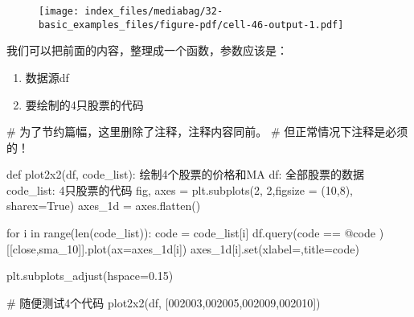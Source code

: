 \documentclass[
  letterpaper,
  DIV=11,
  numbers=noendperiod]{scrreprt}
\newenvironment{Shaded}{\begin{snugshade}}{\end{snugshade}}
\newcommand{\BuiltInTok}[1]{\textcolor[rgb]{0.00,0.23,0.31}{#1}}
\newcommand{\CommentTok}[1]{\textcolor[rgb]{0.37,0.37,0.37}{#1}}
\newcommand{\ControlFlowTok}[1]{\textcolor[rgb]{0.00,0.23,0.31}{#1}}
\newcommand{\DecValTok}[1]{\textcolor[rgb]{0.68,0.00,0.00}{#1}}
\newcommand{\FloatTok}[1]{\textcolor[rgb]{0.68,0.00,0.00}{#1}}
\newcommand{\KeywordTok}[1]{\textcolor[rgb]{0.00,0.23,0.31}{#1}}
\newcommand{\NormalTok}[1]{\textcolor[rgb]{0.00,0.23,0.31}{#1}}
\newcommand{\OperatorTok}[1]{\textcolor[rgb]{0.37,0.37,0.37}{#1}}
\newcommand{\StringTok}[1]{\textcolor[rgb]{0.13,0.47,0.30}{#1}}
\newcommand{\VariableTok}[1]{\textcolor[rgb]{0.07,0.07,0.07}{#1}}
\providecommand{\tightlist}{%
  \setlength{\itemsep}{0pt}\setlength{\parskip}{0pt}}\usepackage{longtable,booktabs,array}
\begin{document}
\begin{figure}[H]

{\centering \texttt{[image: index\_files/mediabag/32-basic\_examples\_files/figure-pdf/cell-46-output-1.pdf]}

}

\end{figure}

我们可以把前面的内容，整理成一个函数，参数应该是：

\begin{enumerate}
\def\labelenumi{\arabic{enumi}.}
\tightlist
\item
  数据源df
\item
  要绘制的4只股票的代码
\end{enumerate}

\begin{Shaded}
\begin{Highlighting}[]
\CommentTok{\# 为了节约篇幅，这里删除了注释，注释内容同前。}
\CommentTok{\# 但正常情况下注释是必须的！}

\KeywordTok{def}\NormalTok{ plot2x2(df, code\_list):}
    \CommentTok{\textquotesingle{}\textquotesingle{}\textquotesingle{}绘制4个股票的价格和MA}
\CommentTok{    }
\CommentTok{        df: 全部股票的数据}
\CommentTok{        code\_list: 4只股票的代码}
\CommentTok{    \textquotesingle{}\textquotesingle{}\textquotesingle{}}
\NormalTok{    fig, axes }\OperatorTok{=}\NormalTok{ plt.subplots(}\DecValTok{2}\NormalTok{, }\DecValTok{2}\NormalTok{,figsize }\OperatorTok{=}\NormalTok{ (}\DecValTok{10}\NormalTok{,}\DecValTok{8}\NormalTok{), sharex}\OperatorTok{=}\VariableTok{True}\NormalTok{)}
\NormalTok{    axes\_1d }\OperatorTok{=}\NormalTok{ axes.flatten()}

    \ControlFlowTok{for}\NormalTok{ i }\KeywordTok{in} \BuiltInTok{range}\NormalTok{(}\BuiltInTok{len}\NormalTok{(code\_list)):}
\NormalTok{        code }\OperatorTok{=}\NormalTok{ code\_list[i]}
\NormalTok{        df.query(}\StringTok{\textquotesingle{}code == @code \textquotesingle{}}\NormalTok{)[[}\StringTok{\textquotesingle{}close\textquotesingle{}}\NormalTok{,}\StringTok{\textquotesingle{}sma\_10\textquotesingle{}}\NormalTok{]].plot(ax}\OperatorTok{=}\NormalTok{axes\_1d[i])}
\NormalTok{        axes\_1d[i].}\BuiltInTok{set}\NormalTok{(xlabel}\OperatorTok{=}\StringTok{\textquotesingle{}\textquotesingle{}}\NormalTok{,title}\OperatorTok{=}\NormalTok{code)}

\NormalTok{    plt.subplots\_adjust(hspace}\OperatorTok{=}\FloatTok{0.15}\NormalTok{)}

\CommentTok{\# 随便测试4个代码}
\NormalTok{plot2x2(df, [}\StringTok{\textquotesingle{}002003\textquotesingle{}}\NormalTok{,}\StringTok{\textquotesingle{}002005\textquotesingle{}}\NormalTok{,}\StringTok{\textquotesingle{}002009\textquotesingle{}}\NormalTok{,}\StringTok{\textquotesingle{}002010\textquotesingle{}}\NormalTok{])}
\end{Highlighting}
\end{Shaded}
\end{document}
